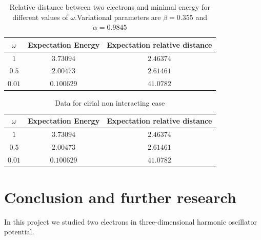 \documentclass[10pt]{article}
\begin{document}
\begin{table}[h!]
  \caption{Relative distance between two electrons and minimal energy for different values of $\omega$.Variational parameters are $\beta = 0.355$ and $\alpha = 0.9845$}
  \label{tab:two}
  \begin{center}
    \begin{tabular}{c|c|c}
    \hline
		$\omega$ & Expectation Energy & Expectation relative distance \\
    \hline
	$	1 $  & $3.73094$ & $2.46374$  \\
	$	0.5$  & $2.00473$ & $2.61461$   \\
	$	0.01$  & $0.100629$ & $41.0782$   \\
	\end{tabular}
  \end{center}
\end{table}

\begin{table}[h!]
  \caption{Data for cirial non interacting case}
  \label{tab:two}
  \begin{center}
    \begin{tabular}{c|c|c}
    \hline
		$\omega$ & Expectation Energy & Expectation relative distance \\
    \hline
	$	1 $  & $3.73094$ & $2.46374$  \\
	$	0.5$  & $2.00473$ & $2.61461$   \\
	$	0.01$  & $0.100629$ & $41.0782$   \\
	\end{tabular}
  \end{center}
\end{table}

\newpage
\clearpage
\section{Conclusion and further research}\label{conc}
In this project we studied two electrons in three-dimensional harmonic oscillator potential. 
\clearpage
\newpage
\end{document}
